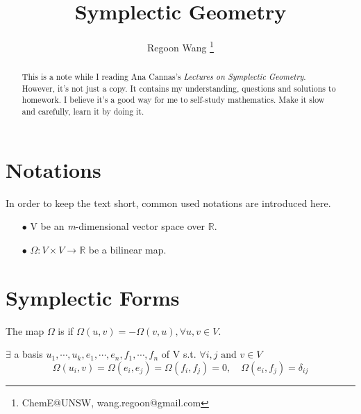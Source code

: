 \documentclass[4paper]{article}
\begin{document}
 
\title{Symplectic Geometry}
\author{Regoon Wang  
\footnote{ChemE@UNSW, wang.regoon@gmail.com}} 


\maketitle
\begin{abstract}
This is a note while I reading Ana Cannas's \textit{Lectures on Symplectic Geometry}. However, it's not just a copy. 
It contains my understanding, questions and solutions to homework. I believe it's a good way for me to self-study 
mathematics. Make it slow and carefully, learn it by doing it.
\end{abstract} 

\tableofcontents
\section{Notations}
In order to keep the text short, common used notations are introduced here.
\begin{enumerate}
\item[$\bullet$] V be an \textit{m}-dimensional vector space over $\mathbb{R}$. 
\item[$\bullet$] $\Omega:V\times V\rightarrow \mathbb{R}$ be a bilinear map.
\end{enumerate}
\section{Symplectic Forms}
\begin{definition}
The map $\Omega$  is  if $\Omega(u,v)=-\Omega(v,u), \forall u,v\in V$.
\end{definition}
\begin{thm}
$\exists$ a basis $u_1,\cdots,u_k,e_1,\cdots,e_n,f_1,\cdots,f_n$ of V s.t. $\forall i,j \text{ and } v\in V$
\begin{equation*}
\Omega(u_i,v)=\Omega(e_i,e_j)=\Omega(f_i,f_j)=0,\quad\Omega(e_i,f_j)=\delta_{ij}
\end{equation*}
\end{thm}
\end{document}
